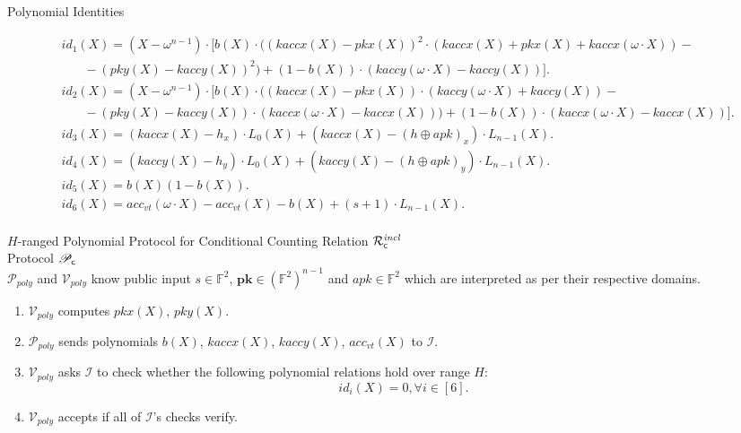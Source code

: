 \noindent \textsf{Polynomial Identities} 

\begin{align*}
& id_1(X) = (X-\omega^{n-1}) \cdot [b(X) \cdot ((kaccx(X)-pkx(X))^2 \cdot (kaccx(X)+ pkx(X) +  kaccx(\omega\cdot X)) - \\ 
& \ \ \ \ \ \ \ \ -(pky(X) - kaccy(X))^2) +  (1-b(X)) \cdot (kaccy(\omega\cdot X) - kaccy(X))]. \\
& id_2(X)  =  (X-\omega^{n-1})\cdot [b(X) \cdot ((kaccx(X) - pkx(X)) \cdot (kaccy(\omega \cdot X) + kaccy(X)) - \\
& \ \ \ \ \ \ \ \ - (pky(X) - kaccy(X)) \cdot (kaccx(\omega \cdot X) - kaccx(X))) + (1-b(X)) \cdot (kaccx(\omega \cdot X) - kaccx(X))]. \\
& id_3(X)  =  (kaccx(X) - h_x)\cdot L_0(X) + (kaccx(X) - (h\oplus apk)_{x}) \cdot L_{n-1}(X). \\ 
& id_4(X) =  (kaccy(X) - h_y)\cdot L_0(X) + (kaccy(X)  - (h\oplus apk)_{y}) \cdot L_{n-1}(X). \\
& id_5(X) =  b(X)(1-b(X)). \\
& id_6(X)  = acc_{vt}(\omega \cdot X) - acc_{vt}(X) - b(X) + (s+1) \cdot L_{n-1}(X).   \\
\end{align*}

\noindent \textsf{{$H$-ranged Polynomial Protocol for Conditional Counting Relation $\mathcal{R}^{\mathit{incl}}_{\mathsf{c}}$}} \\

\noindent \textsf{Protocol $\mathscr{P}_{\mathsf{c}}$} \\

\noindent $\mathcal{P}_{poly}$ and $\mathcal{V}_{poly}$ know public input $s \in \mathbb{F}^2$, 
$\mathbf{pk} \in (\mathbb{F}^2)^{n-1}$ and $\mathit{apk} \in \mathbb{F}^2$ which are interpreted as per their respective domains. 

\begin{enumerate}
\item $\mathcal{V}_{poly}$ computes $pkx(X)$, $pky(X)$.
\item $\mathcal{P}_{poly}$ sends polynomials $b(X)$, $kaccx(X)$, $kaccy(X)$, $acc_{vt}(X)$ to $\mathcal{I}$. 
\item $\mathcal{V}_{poly}$ asks $\mathcal{I}$ to check whether the following polynomial relations hold over range $H$:
$$id_i(X) = 0, \forall i \in [6].$$ 
\item $\mathcal{V}_{poly}$ accepts if all of $\mathcal{I}$'s checks verify. 
\end{enumerate}

